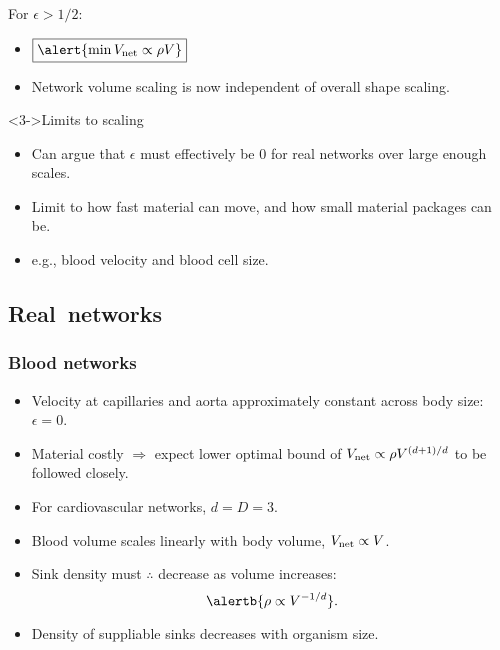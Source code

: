 \begin{frame}

  \begin{block}{For $\epsilon > 1/2$:}
    \begin{itemize}
    \item<1-> 
      $
      \boxed{\alert{
          \min V_{\textnormal{net}} 
          \propto
          \rho V
        }}
      $
    \item<2-> 
      Network volume scaling is now independent 
      of overall shape scaling.
    \end{itemize}
  \end{block}

  \medskip

  \begin{block}<3->{Limits to scaling}
    \begin{itemize}
    \item 
      Can argue that $\epsilon$ must effectively be 0
      for real networks over large enough scales.
    \item 
      Limit to how fast material can move,
      and how small material packages can be.
    \item 
      e.g., blood velocity and blood cell size.
    \end{itemize}
  \end{block}
\end{frame}


\subsection{Real\ networks}

\begin{frame}
  \frametitle{Blood networks}

  \begin{block}{}
    \begin{itemize}
    \item<1-> Velocity at capillaries and 
      aorta approximately constant across body size\cite{weinberg2006a}: 
      $\epsilon = 0$.
    \item<2-> \alert{Material costly} $\Rightarrow$ expect lower optimal bound of 
      $V_{\textnormal{net}} \propto \rho V^{(d+1)/d}$ to be followed closely.
    \item<3->
      For cardiovascular networks, \alert{$d=D=3$}.
    \item<4->
      Blood volume scales linearly with body
      volume\cite{stahl1967a}, $V_{\textnormal{net}} \propto V$.
    \item<5->
      Sink density must $\therefore$ decrease as volume increases:
      $$
      \alertb{\rho \propto V^{-1/d}}.
      $$
    \item<6->
      Density of suppliable sinks \alert{decreases} with organism size.
    \end{itemize}      
  \end{block}

\end{frame}


